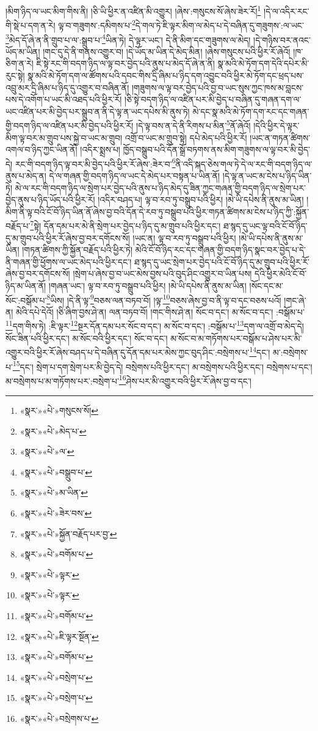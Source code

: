 །མིག་ཉིད་ལ་ཡང་མིག་གིས་ནི། །ཅི་ཡི་ཕྱིར་ན་འཛིན་མི་འགྱུར། །ཞེས་:གསུངས་སོ་ཞེས་ཟེར་རོ།\footnote{«སྣར་»«པེ་»གསུངས་སོ།} །དེ་ལ་འདིར་རང་གི་སྡེ་པ་དག་ན་རེ། ལྟ་བ་གཟུགས་:དམིགས་པ་\footnote{«སྣར་»«པེ་»མེད་པ་}དེ་གལ་ཏེ་ཇི་ལྟར་མིག་ལ་མེད་པ་དེ་བཞིན་དུ་གཟུགས་:ལ་ཡང་\footnote{«སྣར་»«པེ་»ལ་}མེད་དོ་ཞེ་ན་ནི་གྲུབ་པ་ལ་:སྒྲུབ་པ་\footnote{«སྣར་»«པེ་»བསྒྲུབ་པ་}ཡིན་ཏེ། དེ་ལྟར་ཡང་། དེ་ནི་མིག་དང་གཟུགས་ལ་མེད། །དེ་གཉིས་བར་ནའང་ཡོད་མ་ཡིན། །གང་དུ་དེ་ནི་གནས་འགྱུར་བ། །དེ་ཡོད་མ་ཡིན་དེ་མེད་མིན། །ཞེས་གསུངས་པའི་ཕྱིར་རོ་ཞེའོ། །ཁ་ཅིག་ན་རེ། ཇི་སྟེ་རང་གི་བདག་ཉིད་ལ་ལྟ་བར་བྱེད་པའི་ནུས་པ་མེད་དོ་ཞེ་ན་ནི། སྣ་མའི་མེ་ཏོག་དག་དེའི་དཔེར་མི་རུང་སྟེ། སྣ་མའི་མེ་ཏོག་དག་ལ་ཚོགས་པའི་དབང་གིས་དྲི་ཞིམ་པ་ཉིད་དག་འབྱུང་བའི་ཕྱིར་མེ་ཏོག་དང་ཕྲད་པས་འབྲུ་མར་དྲི་ཞིམ་པ་ཉིད་དུ་འགྱུར་བ་བཞིན་ནོ། །གཟུགས་ལ་ལྟ་བར་བྱེད་པའི་བྱ་བ་ཡང་སུས་ཀྱང་ཁས་མ་བླངས་པས་དེ་འགོག་པ་ཡང་མི་འཐད་པའི་ཕྱིར་རོ། །ཅི་སྟེ་བདག་ཉིད་ལ་འཛིན་པར་མི་བྱེད་པ་བཞིན་དུ་གཞན་དག་ལ་ཡང་འཛིན་པར་མི་བྱེད་པར་སྒྲུབ་ན་ནི་དེ་ལྟ་ན་ཡང་དཔེས་མི་ནུས་ཏེ། མེ་དང་སྣ་མའི་མེ་ཏོག་དག་རང་དང་གཞན་གྱི་བདག་ཉིད་ལ་འཛིན་པར་མི་བྱེད་པའི་ཕྱིར་རོ། །དེ་ལྟ་བས་ན་དེ་ནི་རིགས་པ་མིན་\footnote{«སྣར་»«པེ་»མ་ཡིན་}ནོ་ཞེའོ། །དེའི་ཕྱིར་དེ་ལྟར་མིག་ལྟ་བར་མ་གྲུབ་པས་སྐྱེ་བ་ཡང་མ་གྲུབ། འགྲོ་བ་ཡང་མ་གྲུབ་སྟེ། དཔེ་མེད་པའི་ཕྱིར་རོ། །ཡང་ན་གཏན་ཚིགས་འགལ་བ་ཉིད་ཀྱང་ཡིན་ནོ། །འདིར་སྨྲས་པ། ཁྱོད་བསྒྲུབ་པའི་དོན་སྒྲོ་བཏགས་ནས་མིག་གཟུགས་ལ་ལྟ་བར་མི་བྱེད་དེ། རང་གི་བདག་ཉིད་ལྟ་བར་མི་བྱེད་པའི་ཕྱིར་རོ་ཞེས་:ཟེར་བ་\footnote{«སྣར་»«པེ་»ཟེར་བས་}ནི་འདི་སྐད་ཅེས་གལ་ཏེ་དེ་ལ་རང་གི་བདག་ཉིད་ལ་ནུས་པ་མེད་ན། དེ་ལ་གཞན་གྱི་བདག་ཉིད་ལ་ཡང་དེ་མེད་པར་བསྟན་པ་ཡིན་ནོ། །དེ་ལྟ་ན་ཡང་མ་ངེས་པ་ཉིད་ཡིན་ཏེ། མེ་ལ་རང་གི་བདག་ཉིད་ལ་སྲེག་པར་བྱེད་པའི་ནུས་པ་ཉིད་མེད་དུ་ཟིན་ཀྱང་གཞན་གྱི་བདག་ཉིད་ལ་སྲེག་པར་བྱེད་ནུས་པ་ཉིད་ཡོད་པའི་ཕྱིར་རོ། །འདིར་བཤད་པ། ལྟ་བ་རབ་ཏུ་བསྒྲུབ་པའི་ཕྱིར། །མེ་ཡི་དཔེས་ནི་ནུས་མ་ཡིན། །མིག་ནི་ལྟ་བའི་ངོ་བོ་ཉིད་ཡིན་ནོ་ཞེས་བྱ་བའི་དོན་དེ་རབ་ཏུ་བསྒྲུབ་པའི་ཕྱིར་གཏན་ཚིགས་མ་ངེས་པ་ཉིད་ཀྱི་:སྐྱོན་བརྗོད་པ་\footnote{«སྣར་»«པེ་»སྐྱོན་བརྗོད་པར་བྱ་}སྟེ། དོན་དམ་པར་མེ་ནི་སྲེག་པར་བྱེད་པ་ཉིད་དུ་མ་གྲུབ་པའི་ཕྱིར་དང་། ཐ་སྙད་དུ་ཡང་ལྟ་བའི་ངོ་བོ་ཉིད་དུ་མ་གྲུབ་པའི་ཕྱིར་རོ་ཞེས་བྱ་བར་དགོངས་སོ། །ཡང་ན། ལྟ་བ་རབ་ཏུ་བསྒྲུབ་པའི་ཕྱིར། །མེ་ཡི་དཔེས་ནི་ནུས་མ་ཡིན། །གཏན་ཚིགས་ཀྱི་སྐྱོན་བརྗོད་པའི་ཕྱིར་ཏེ། མེའི་ངོ་བོ་ཉིད་རང་དང་གཞན་གྱི་བདག་ཉིད་སྣང་བར་བྱེད་པ་དེ་ནི་གཞན་གྱི་ཕྱོགས་ལ་ཡང་མེད་པའི་ཕྱིར་དང་། ཐ་སྙད་དུ་ཡང་སྲེག་པར་བྱེད་པའི་ངོ་བོ་ཉིད་དུ་མ་གྲུབ་པའི་ཕྱིར་རོ་ཞེས་བྱ་བར་དགོངས་སོ། །སྲེག་པ་ཞེས་བྱ་བ་ཡང་མེས་བྱས་པའི་བུད་ཤིང་འགྱུར་བ་ཡིན་པས། དེའི་ཕྱིར་མེའི་ངོ་བོ་ཉིད་མ་ཡིན་ནོ། །གཞན་ཡང་། ལྟ་བ་རབ་ཏུ་བསྒྲུབ་པའི་ཕྱིར། །མེ་ཡི་དཔེས་ནི་ནུས་མ་ཡིན། །སོང་དང་མ་སོང་:བསྒོམ་པ་\footnote{«སྣར་»«པེ་»བགོམ་པ་}ཡིས། །དེ་ནི་ལྟ་\footnote{«སྣར་»«པེ་»ལྟར་}བཅས་ལན་བཏབ་བོ། །ལྟ་\footnote{«སྣར་»«པེ་»ལྟར་}བཅས་ཞེས་བྱ་བ་ནི་ལྟ་བ་དང་བཅས་པའོ། །གང་ཞེ་ན། མེའི་དཔེ་དེའོ། །ཅི་ཞིག་བྱས་ཤེ་ན། ལན་བཏབ་བོ། །གང་གིས་ཤེ་ན། སོང་བ་དང་། མ་སོང་བ་དང་། :བསྒོམ་པ་\footnote{«སྣར་»«པེ་»བགོམ་པ་}དག་གིས་ཏེ། :ཇི་ལྟར་\footnote{«སྣར་»«པེ་»ཇི་ལྟར་སྔོན་}སྔར་དོན་དམ་པར་སོང་བ་དང་། མ་སོང་བ་དང་། :བསྒོམ་པ་\footnote{«སྣར་»«པེ་»བགོམ་པ་}དག་ལ་འགྲོ་བ་མེད་དེ། སོང་ཟིན་པའི་ཕྱིར་དང་། མ་སོང་བའི་ཕྱིར་དང་། སོང་བ་དང་། མ་སོང་བ་མ་གཏོགས་པར་བསྒོམ་པ་ཤེས་པར་མི་འགྱུར་བའི་ཕྱིར་རོ་ཞེས་བཤད་པ་དེ་བཞིན་དུ་དོན་དམ་པར་མེས་ཀྱང་བུད་ཤིང་:བསྲེགས་པ་\footnote{«སྣར་»«པེ་»བསྲེག་པ་}དང་། མ་:བསྲེགས་པ་\footnote{«སྣར་»«པེ་»བསྲེག་པ་}དང་། སྲེག་པ་དག་སྲེག་པར་མི་བྱེད་དེ། བསྲེགས་པའི་ཕྱིར་དང་། མ་བསྲེགས་པའི་ཕྱིར་དང་། བསྲེགས་པ་དང་། མ་བསྲེགས་པ་མ་གཏོགས་པར་:བསྲེག་པ་\footnote{«སྣར་»«པེ་»བསྲེགས་པ་}ཤེས་པར་མི་འགྱུར་བའི་ཕྱིར་རོ་ཞེས་བྱ་བ་དང་། 